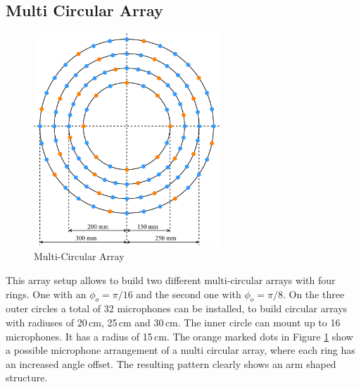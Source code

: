 \subsection{Multi Circular Array}
\begin{minipage}{\linewidth}
	\begin{figure}
		\vspace{-0.9cm}
		\includegraphics[width=7cm]{images/5_array_evaluation/prototype_array_multi_circular.pdf}
		\centering
		\caption{Multi-Circular Array}
		\label{fig:prototype_array_multi_circular}
	\end{figure}
	This array setup allows to build two different multi-circular arrays with four rings.
	One with an $\phi_o = \pi/16$ and the second one with $\phi_o = \pi / 8$.
	On the three outer circles a total of 32 microphones can be installed, to
	build circular arrays with radiuses of 20\,cm, 25\,cm and 30\,cm.
	The inner circle can mount up to 16 microphones.
	It has a radius of 15\,cm.
	The orange marked dots in Figure \ref{fig:prototype_array_multi_circular} show a possible microphone arrangement of a multi circular array,
	where each ring has an increased angle offset.
	The resulting pattern clearly shows an arm shaped structure.
\end{minipage}
\vspace{1.4cm}    %

